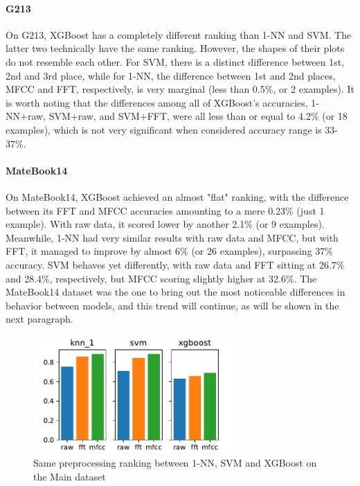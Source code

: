 \documentclass[../main.tex]{subfiles}
\begin{document}
\paragraph{G213}
On G213, XGBoost has a completely different ranking than 1-NN and SVM.
The latter two technically have the same ranking. However, the shapes of their plots do not resemble each other. For SVM, there is a distinct difference between 1st, 2nd and 3rd place, while for 1-NN, the difference between 1st and 2nd places, MFCC and FFT, respectively, is very marginal (less than 0.5\%, or 2 examples).
It is worth noting that the differences among all of XGBoost's accuracies, 1-NN+raw, SVM+raw, and SVM+FFT, were all less than or equal to 4.2\% (or 18 examples), which is not very significant when considered accuracy range is 33-37\%.

\paragraph{MateBook14}
On MateBook14, XGBoost achieved an almost "flat" ranking, with the difference between its FFT and MFCC accuracies amounting to a mere 0.23\% (just 1 example). With raw data, it scored lower by another 2.1\% (or 9 examples). Meanwhile, 1-NN had very similar results with raw data and MFCC, but with FFT, it managed to improve by almost 6\% (or 26 examples), surpassing 37\% accuracy. SVM behaves yet differently, with raw data and FFT sitting at 26.7\% and 28.4\%, respectively, but MFCC scoring slightly higher at 32.6\%. The MateBook14 dataset was the one to bring out the most noticeable differences in behavior between models, and this trend will continue, as will be shown in the next paragraph.

\begin{figure}
    \centering
    \includegraphics[width=0.7\textwidth]{figures/plots/model_comparison/custom_knn_1_xgboost_svm_main.pdf}
    \caption{Same preprocessing ranking between 1-NN, SVM and XGBoost on the Main dataset}
    \label{fig:selective_model_comparison_knn_xgboost_svm_main}
\end{figure}
\end{document}

